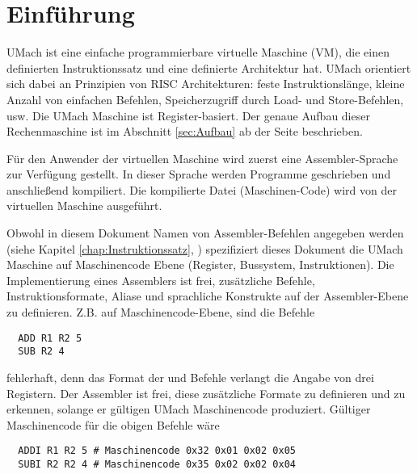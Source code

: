 \chapter{Einführung}

UMach ist eine einfache programmierbare virtuelle Maschine (VM), die einen
definierten Instruktionssatz und eine definierte Architektur hat. UMach
orientiert sich dabei an Prinzipien von RISC Architekturen: feste
Instruktionslänge, kleine Anzahl von einfachen Befehlen, Speicherzugriff durch
Load- und Store-Befehlen, usw. Die UMach Maschine ist Register-basiert. Der
genaue Aufbau dieser Rechenmaschine ist im Abschnitt \ref{sec:Aufbau} ab der
Seite \pageref{sec:Aufbau} beschrieben.


Für den Anwender der virtuellen Maschine wird zuerst eine Assembler-Sprache zur
Verfügung gestellt. In dieser Sprache werden Programme geschrieben und
anschließend kompiliert. Die kompilierte Datei (Maschinen-Code) wird
von der virtuellen Maschine ausgeführt.

Obwohl in diesem Dokument Namen von Assembler-Befehlen angegeben werden (siehe 
Kapitel \ref{chap:Instruktionssatz}, )
spezifiziert dieses Dokument die UMach Maschine auf Maschinencode Ebene
(Register, Bussystem, Instruktionen).
Die Implementierung eines Assemblers ist frei, zusätzliche Befehle,
Instruktionsformate, Aliase und sprachliche Konstrukte auf der Assembler-Ebene
zu definieren. Z.B. auf Maschinencode-Ebene, sind die Befehle
\begin{lstlisting}
  ADD R1 R2 5
  SUB R2 4
\end{lstlisting}
fehlerhaft, denn das Format der  und  Befehle verlangt die
Angabe von drei Registern. Der Assembler ist frei, diese zusätzliche Formate zu
definieren und zu erkennen, solange er gültigen UMach Maschinencode produziert.
Gültiger Maschinencode für die obigen Befehle wäre
\begin{lstlisting}
  ADDI R1 R2 5 # Maschinencode 0x32 0x01 0x02 0x05
  SUBI R2 R2 4 # Maschinencode 0x35 0x02 0x02 0x04
\end{lstlisting}



